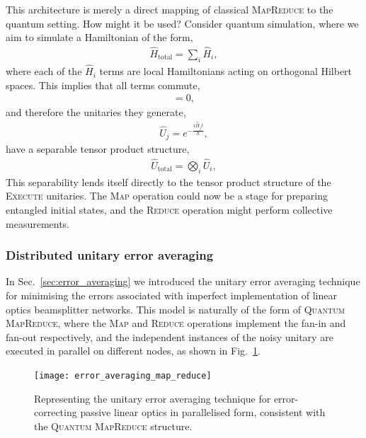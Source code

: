 This architecture is merely a direct mapping of classical \textsc{MapReduce} to the quantum setting. How might it be used? Consider quantum simulation, where we aim to simulate a Hamiltonian of the form,
\begin{align}
\hat{H}_\mathrm{total} = \sum_i \hat{H}_i,	
\end{align}
where each of the $\hat{H}_i$ terms are local Hamiltonians acting on orthogonal Hilbert spaces. This implies that all terms commute,
\begin{align}
[\hat{H}_i,\hat{H}_j]=0,
\end{align}
and therefore the unitaries they generate,
\begin{align}
	\hat{U}_j=e^{-\frac{i\hat{H}_jt}{\hbar}},
\end{align}
have a separable tensor product structure,
\begin{align}
	\hat{U}_\mathrm{total}=\bigotimes_i \hat{U}_i,
\end{align}
This separability lends itself directly to the tensor product structure of the \textsc{Execute} unitaries. The \textsc{Map} operation could now be a stage for preparing entangled initial states, and the \textsc{Reduce} operation might perform collective measurements.

\subsubsection{Distributed unitary error averaging}\label{sec:error_av_parallel}

In Sec.~\ref{sec:error_averaging} we introduced the unitary error averaging technique for minimising the errors associated with imperfect implementation of linear optics beamsplitter networks. This model is naturally of the form of \textsc{Quantum MapReduce}, where the \textsc{Map} and \textsc{Reduce} operations implement the fan-in and fan-out respectively, and the independent instances of the noisy unitary are executed in parallel on different nodes, as shown in Fig.~\ref{fig:error_av_map_reduce}.

\begin{figure}[!htb]
	\texttt{[image: error\_averaging\_map\_reduce]}
	\caption{Representing the unitary error averaging technique for error-correcting passive linear optics in parallelised form, consistent with the \textsc{Quantum MapReduce} structure.}\label{fig:error_av_map_reduce}
\end{figure}

